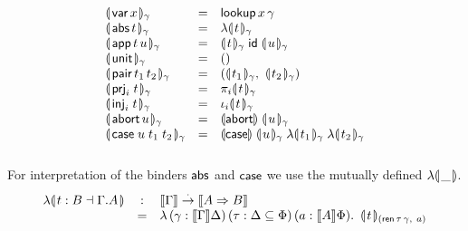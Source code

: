 \documentclass[a4paper,USenglish,cleveref, autoref]{lipics-v2019}
\begin{document}
\[
\begin{array}{lcl}
  \dent{\tvar\,x}\gamma & = & \tlookup\,x\,\gamma \\
  \dent{\tabs\,t}\gamma
      & = & \fdent t \gamma \\
  \dent{\tapp\,t\,u} \gamma & = &
     \dent t \gamma\;\tid\;\dent u \gamma \\
  \dent{\tunit}\gamma & = & \ttempty \\
  \dent{\tpair\,t_1\,t_2}\gamma & = &
    (\dent{t_1}\gamma,\ \dent{t_2}\gamma) \\
  \dent{\prj i t}\gamma & = & \pi_i \dent t \gamma \\
  \dent{\inj i t}\gamma & = & \iota_i \dent t \gamma \\
  \dent{\tabort\,u}\gamma & = & \denabort\;\dent u \gamma \\
  \dent{\tcase\;u\;t_1\;t_2}\gamma & = &
     \dencase\;\dent u \gamma\;\fdent{t_1}\gamma\;\fdent{t_2}\gamma \\
    \\
\end{array}
\]
For interpretation of the binders $\tabs$ and $\tcase$ we use the
mutually defined $\fden{\_}$.
\[
\begin{array}{lcl}
  \fden{t : B \from \cext \Gamma A}
    & : & \den \Gamma \todot \den{A \To B} \\
    & = &
      \lambda\, (\gamma : \den \Gamma \Delta)
      \,(\tau : \Delta \sublist \Phi)
      \,(a : \den A \Phi)
      .\ \,
      \dent t {(\tren\,\tau\,\gamma,\ a)} \\
\end{array}
\]
\end{document}
